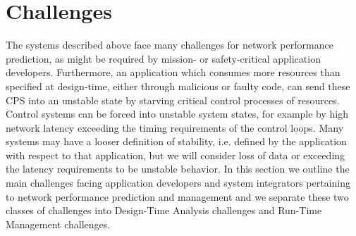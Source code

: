 \section{Challenges}
\label{sec:challenges}
The systems described above face many challenges for network
performance prediction, as might be required by mission- or
safety-critical application developers.  Furthermore, an application
which consumes more resources than specified at design-time, either
through malicious or faulty code, can send these CPS into an unstable
state by starving critical control processes of resources.  Control
systems can be forced into unstable system states, for example by high
network latency exceeding the timing requirements of the control
loops.  Many systems may have a looser definition of stability,
i.e. defined by the application with respect to that application, but
we will consider loss of data or exceeding the latency requirements to
be unstable behavior. In this section we outline the main challenges
facing application developers and system integrators pertaining to
network performance prediction and management and we separate these
two classes of challenges into Design-Time Analysis challenges and
Run-Time Management challenges.

